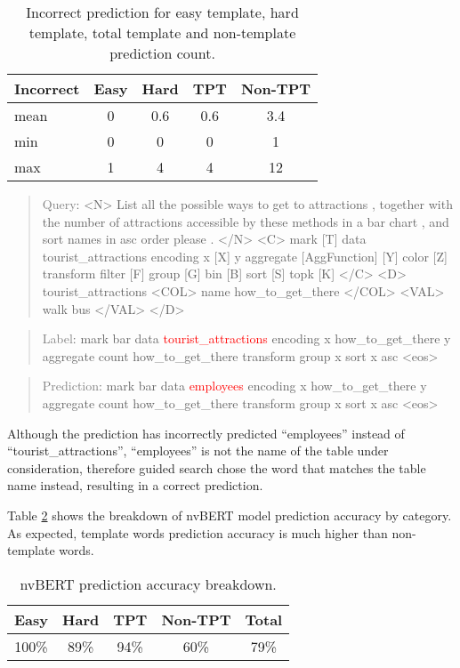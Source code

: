 \documentclass[
	a4paper, %
	10pt, %
	unnumberedsections, %
	twoside, %
]{t0003}
\newcommand{\gray}[1]{\textcolor{gray}{#1}}
\newcommand{\red}[1]{\textcolor{red}{#1}}
\begin{document}
\begin{table}
	\caption{Incorrect prediction for easy template, hard template, total template and non-template prediction count.}
	\centering
	\begin{tabular}{lcccc}
		\toprule
		Incorrect & Easy & Hard & TPT & Non-TPT \\
		\midrule
		mean & 0 & 0.6 & 0.6 & 3.4 \\
min & 0 & 0 & 0 & 1 \\
max & 1 & 4 & 4 & 12 \\
		\bottomrule
	\end{tabular}
	\label{tab:incorrectcount}
\end{table}

\begin{quote}
\gray{Query}: <N> List all the possible ways to get to attractions , together with the number of attractions accessible by these methods in a bar chart , and sort names in asc order please . </N> <C> mark [T] data tourist\_attractions encoding x [X] y aggregate [AggFunction] [Y] color [Z] transform filter [F] group [G] bin [B] sort [S] topk [K] </C> <D> tourist\_attractions <COL> name how\_to\_get\_there </COL> <VAL> walk bus </VAL> </D>
\end{quote}

\begin{quote}
\gray{Label}: mark bar data \red{tourist\_attractions} encoding x how\_to\_get\_there y aggregate count how\_to\_get\_there transform group x sort x asc <eos>
\end{quote}

\begin{quote}
\gray{Prediction}: mark bar data \red{employees} encoding x how\_to\_get\_there y aggregate count how\_to\_get\_there transform group x sort x asc <eos>
\end{quote}

Although the prediction has incorrectly predicted ``employees'' instead of ``tourist\_attractions'', ``employees'' is not the name of the table under consideration, therefore guided search chose the word that matches the table name instead, resulting in a correct prediction.

Table \ref{tab:accuracybreakdown} shows the breakdown of nvBERT model prediction accuracy by category. As expected, template words prediction accuracy is much higher than non-template words.

\begin{table}
	\caption{nvBERT prediction accuracy breakdown.}
	\centering
	\begin{tabular}{ccccc }
		\toprule
		Easy & Hard & TPT & Non-TPT & Total \\
		\midrule
		100\% & 89\% & 94\% & 60\% & 79\% \\
		\bottomrule
	\end{tabular}
	\label{tab:accuracybreakdown}
\end{table}
\end{document}
